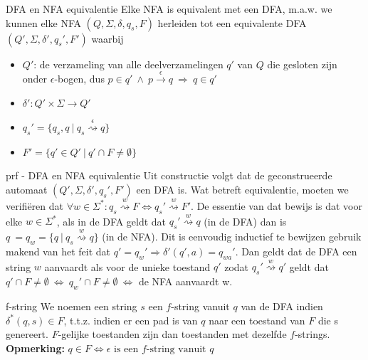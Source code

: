 \begin{lem}{DFA en NFA equivalentie}
    Elke NFA is equivalent met een DFA, m$.$a$.$w$.$ we kunnen elke NFA \((Q, \Sigma, \delta, q_s, F)\) herleiden tot een
    equivalente DFA \((Q', \Sigma, \delta', q_s', F')\) waarbij
    \begin{itemize}
        \item \(Q'\): de verzameling van alle deelverzamelingen $q'$ van $Q$ die gesloten zijn onder \(\epsilon\)-bogen, dus
              \(p \in q' \ \wedge \ p \overset{\epsilon}{\to} q \ \Rightarrow \ q \in q'\)
        \item \(\delta': Q' \times \Sigma \rightarrow Q'\)
        \item \(q_{s}' = \{q_s,q \ | \ q_s \overset{\epsilon}{\rightsquigarrow} q \}\)
        \item \(F' = \{q' \in Q' \ | \ q' \cap F \neq \emptyset \}\)
    \end{itemize}
    \vspace{-0.3cm}
\end{lem}

\newpage

\begin{prf}{prf - DFA en NFA equivalentie}
    Uit constructie volgt dat de geconstrueerde automaat \((Q', \Sigma, \delta', q_s', F')\) een DFA is.
    Wat betreft equivalentie, moeten we verifiëren dat \(\forall w \in \Sigma^*:  q_s \overset{w}{\rightsquigarrow} F \Leftrightarrow q_s' \overset{w}{\rightsquigarrow} F'\). 
    De essentie van dat bewijs is dat voor elke \(w \in \Sigma^*\), als in de DFA geldt dat \(q_s' \overset{w}{\rightsquigarrow} q\) (in de DFA) dan is \(q\ = q_w = \{ q \ | \ q_s \overset{w}{\rightsquigarrow} q \}\) (in de NFA).
    Dit is eenvoudig inductief te bewijzen gebruik makend van het feit dat \(q' = q_w' \Rightarrow \delta'(q',a) = q_{wa}'\). Dan geldt dat de 
    DFA een string $w$ aanvaardt als voor de unieke toestand \(q'\) zodat \(q_s' \overset{w}{\rightsquigarrow} q'\) geldt dat \(q' \cap F \neq \emptyset \ \Leftrightarrow \ q_w' \cap F \neq \emptyset \ \Leftrightarrow\) de NFA aanvaardt w.
\end{prf}

\begin{theo}[$f$-string]{f-string}
    We noemen een string $s$ een $f$-string vanuit $q$ van de DFA indien \(\delta^*(q,s) \in F\), t$.$t$.$z$.$ indien er een pad is van $q$ naar een toestand van $F$ die s genereert. $F$-gelijke toestanden
    zijn dan toestanden met dezelfde $f$-strings. \vspace{0.3cm}\\
    \textbf{Opmerking:} \(q \in F \Leftrightarrow \epsilon \text{ is een $f$-string vanuit $q$}\)
\end{theo}

